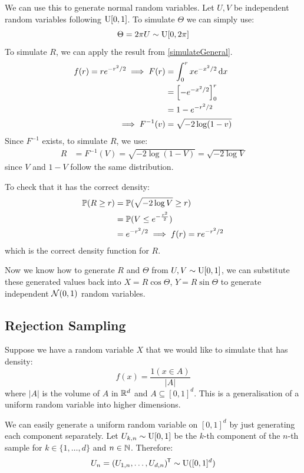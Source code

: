 \documentclass[../main.tex]{subfiles}
\begin{document}
We can use this to generate normal random variables.
Let $U, V$ be independent random variables following $\uniform[0, 1]$.
To simulate $\Theta$ we can simply use:
\[
  \Theta = 2\pi U \sim \uniform[0, 2\pi]
\]
To simulate $R$, we can apply the result from \cref{simulateGeneral}.
\begin{align*}
  f(r) = re^{-r^2/2} \implies F(r) &= \int_{0}^{r} xe^{-x^2/2} \d{x} \\
                                   &= \eval{-e^{-x^2/2}}{0}{r} \\
                                   &= 1 - e^{-r^2/2} \\
  \implies F^{-1}(v) &= \sqrt{-2 \log (1 - v)}
\end{align*}
Since $F^{-1}$ exists, to simulate $R$, we use:
\begin{align*}
  R &= F^{-1}(V) = \sqrt{-2\log(1 - V)} = \sqrt{-2\log V}
\end{align*}
since $V$ and $1 - V$ follow the same distribution.

To check that it has the correct density:
\begin{align*}
  \P(R \geq r) &= \P(\sqrt{-2\log V} \geq r) \\
               &= \P(V \leq e^{-\frac{r^2}{2}}) \\
               &= e^{-r^2/2} \implies f(r) = re^{-r^2/2}
\end{align*}
which is the correct density function for $R$.

Now we know how to generate $R$ and $\Theta$ from $U, V \sim \uniform[0, 1]$, we can substitute these generated values back into $X = R\cos \Theta$, $Y = R\sin \Theta$ to generate independent $\normal(0, 1)$ random variables.
\subsection{Rejection Sampling}
Suppose we have a random variable $X$ that we would like to simulate that has density:
\[
  f(x) = \frac{1(x \in A)}{|A|}
\]
where $|A|$ is the volume of $A$ in $\R^{d}$ and $A \subseteq [0, 1]^{d}$.
This is a generalisation of a uniform random variable into higher dimensions.

We can easily generate a uniform random variable on $[0, 1]^{d}$ by just generating each component separately.
Let $U_{k, n} \sim \uniform[0, 1]$ be the $k$-th component of the $n$-th sample for $k \in \{1, \ldots, d\}$ and $n \in \N$.
Therefore:
\[
  U_n = (U_{1, n}, \ldots, U_{d, n})^{\trans} \sim \uniform([0, 1]^{d})
\]
\end{document}
